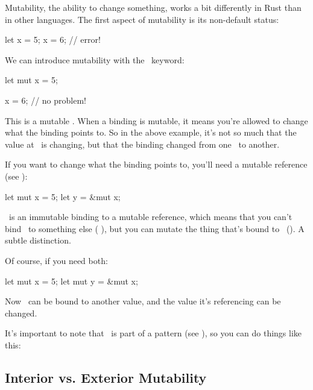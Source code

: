 Mutability, the ability to change something, works a bit differently in Rust than in other languages. The first aspect of 
mutability is its non-default status:

\begin{rustc}
let x = 5;
x = 6; // error!
\end{rustc}

We can introduce mutability with the \mut\ keyword:

\begin{rustc}
let mut x = 5;

x = 6; // no problem!
\end{rustc}

This is a mutable . When a binding is mutable, it means you're allowed to change what the 
binding points to. So in the above example, it's not so much that the value at \x\ is changing, but that the binding changed
from one \itt\ to another.

\blank

If you want to change what the binding points to, you'll need a mutable reference (see ):

\begin{rustc}
let mut x = 5;
let y = &mut x;
\end{rustc}

\y\ is an immutable binding to a mutable reference, which means that you can't bind \y\ to something else (
), but you can mutate the thing that's bound to \y\ (). A subtle distinction.

\blank

Of course, if you need both:

\begin{rustc}
let mut x = 5;
let mut y = &mut x;
\end{rustc}

Now \y\ can be bound to another value, and the value it's referencing can be changed.

\blank

It's important to note that \mut\ is part of a pattern (see ), so you can do things like this:

\begin{rustc}
let (mut x, y) = (5, 6);

fn foo(mut x: i32) {
\end{rustc}

\subsection*{Interior vs. Exterior Mutability}


